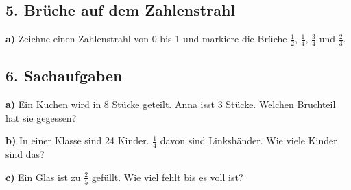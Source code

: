 \subsection*{5. Brüche auf dem Zahlenstrahl}
\textbf{a)} Zeichne einen Zahlenstrahl von 0 bis 1 und markiere die Brüche $\frac{1}{2}$, $\frac{1}{4}$, $\frac{3}{4}$ und $\frac{2}{3}$.

\begin{center}
\end{center}

\subsection*{6. Sachaufgaben}
\textbf{a)} Ein Kuchen wird in 8 Stücke geteilt. Anna isst 3 Stücke. Welchen Bruchteil hat sie gegessen?

\textbf{b)} In einer Klasse sind 24 Kinder. $\frac{1}{4}$ davon sind Linkshänder. Wie viele Kinder sind das?

\textbf{c)} Ein Glas ist zu $\frac{2}{5}$ gefüllt. Wie viel fehlt bis es voll ist?

